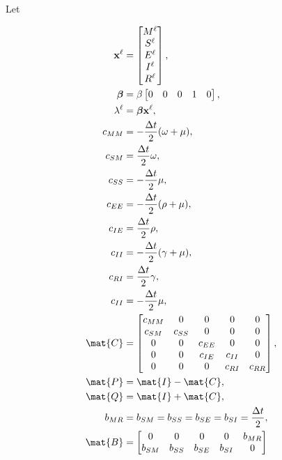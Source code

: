 \documentclass{jpmarticle}
\renewcommand{\vec}[1]{\boldsymbol{\mathrm{#1}}}
\let\subequationsorig\subequations%
\let\endsubequationsorig\endsubequations%
\renewenvironment{subequations}{
  \subequationsorig
  \renewcommand{\theequation}{\theparentequation.\arabic{equation}}
}{
  \endsubequationsorig
}
\begin{document}
Let
\begin{subequations}
  \begin{align}
    \vec{x}^{\ell} &=
    \begin{bmatrix}
      M^{\ell} \\ S^{\ell} \\ E^{\ell} \\ I^{\ell} \\ R^{\ell}
    \end{bmatrix},
    \\
    \vec{\beta} &=
    \beta
    \begin{bmatrix}
      0 & 0 & 0 & 1 & 0
    \end{bmatrix},
    \\
    \lambda^{\ell} &=
    \vec{\beta} \vec{x}^{\ell},
    \\
    c_{MM} &= - \frac{\Delta t}{2} (\omega + \mu),
    \\
    c_{SM} &= \frac{\Delta t}{2} \omega,
    \\
    c_{SS} &= - \frac{\Delta t}{2} \mu,
    \\
    c_{EE} &= - \frac{\Delta t}{2} (\rho + \mu),
    \\
    c_{IE} &= \frac{\Delta t}{2} \rho,
    \\
    c_{II} &= - \frac{\Delta t}{2} (\gamma + \mu),
    \\
    c_{RI} &= \frac{\Delta t}{2} \gamma,
    \\
    c_{II} &= - \frac{\Delta t}{2} \mu,
    \\
    \mat{C} &=
    \begin{bmatrix}
      c_{MM} & 0 & 0 & 0 & 0
      \\
      c_{SM} & c_{SS} & 0 & 0 & 0
      \\
      0 & 0 & c_{EE} & 0 & 0 \\
      0 & 0 & c_{IE} & c_{II} & 0
      \\
      0 & 0 & 0 & c_{RI} & c_{RR}
    \end{bmatrix},
    \\
    \mat{P} &= \mat{I} - \mat{C},
    \\
    \mat{Q} &= \mat{I} + \mat{C},
    \\
    b_{MR} &= b_{SM} = b_{SS} = b_{SE} = b_{SI}
    = \frac{\Delta t}{2},
    \\
    \mat{B} &=
    \begin{bmatrix}
      0 & 0 & 0 & 0 & b_{MR}
      \\
      b_{SM} & b_{SS} & b_{SE} & b_{SI} & 0
      \\

\end{bmatrix}
\end{align}
\end{subequations}
\end{document}
